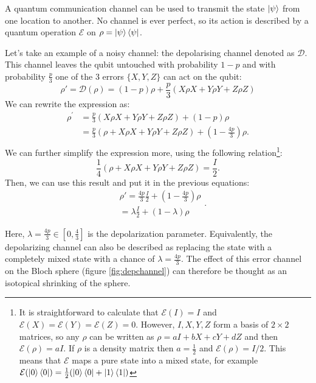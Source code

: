 A quantum communication channel can be used to transmit the state $\ket{\psi}$ from one location to another. No channel is ever perfect, so its action is described by a quantum operation $\mathcal{E}$ on $\rho=\ket{\psi}\bra{\psi}$.

Let's take an example of a noisy channel: the depolarising channel denoted as $\mathcal{D}$. This channel leaves the qubit untouched with probability $1-p$ and with probability $\frac{p}{3}$ one of the 3 errors $\{X,Y,Z\}$ can act on the qubit: 
\begin{equation}
    \rho'=\mathcal{D}(\rho) = (1-p)\rho + \frac{p}{3}\left(X\rho X +Y \rho Y+Z \rho Z\right)
\end{equation}
We can rewrite the expression as: 
$$
\begin{aligned}
\rho^{\prime} &=\frac{p}{3}(X \rho X+Y \rho Y+Z \rho Z)+(1-p) \rho \\
&=\frac{p}{3}(\rho+X \rho X+Y \rho Y+Z \rho Z)+\left(1-\frac{4 p}{3}\right) \rho. \\
\end{aligned}
$$
We can further simplify the expression more, using the following relation\footnote{It is straightforward to calculate that $\mathcal{E}(I)=I$ and $\mathcal{E}(X)=\mathcal{E}(Y)=\mathcal{E}(Z)=0$. However, $I, X, Y, Z$ form a basis of $2\times2$ matrices, so any $\rho$ can be written as $\rho=a I+b X+c Y+d Z$ and then $\mathcal{E}(\rho)=a I$. If $\rho$ is a density matrix then $a=\frac{1}{2}$ and $\mathcal{E}(\rho)=I / 2$. This means that $\mathcal{E}$ maps a pure state into a mixed state, for example $\mathcal{E}(\ket{0}\bra{0}) =\frac{1}{2}(\ket{0}\bra{0} + \ket{1}\bra{1})$}: 
$$
\frac{1}{4}(\rho+X \rho X+Y \rho Y+Z \rho Z)=\frac{I}{2}.
$$
Then, we can use this result and put it in the previous equations: 
$$
\begin{aligned}
&\rho'=\frac{4 p}{3} \frac{I}{2}+\left(1-\frac{4 p}{3}\right) \rho \\
&=\lambda \frac{I}{2}+(1-\lambda) \rho
\end{aligned}.
$$

Here, $\lambda=\frac{4 p}{3} \in\left[0, \frac{4}{3}\right]$ is the depolarization parameter. Equivalently, the depolarizing channel can also be described as replacing the state with a completely mixed state with a chance of $\lambda = \frac{4p}{3}$. The effect of this error channel on the Bloch sphere (figure \ref{fig:depchannel}) can therefore be thought as an isotopical shrinking of the sphere. 

